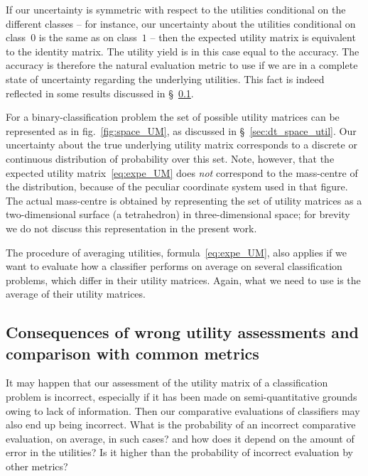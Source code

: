 \documentclass[\ifafour a4paper,12pt,\else a5paper,10pt,\fi%
onecolumn,oneside,article,%
british%
]{memoir}
\theoremstyle{remark}
\theoremstyle{innote}
\renewcommand*{\|}[1][]{\nonscript\:#1\vert\nonscript\:\mathopen{}}
\newcommand*{\sect}{\S}%
\newcommand*{\fig}{fig.}%
\begin{document}
If our uncertainty is symmetric with respect to the utilities conditional on the different classes -- for instance, our uncertainty about the utilities conditional on class~$0$ is the same as on class~$1$ -- then the expected utility matrix is equivalent to the identity matrix. The utility yield is in this case equal to the accuracy. The accuracy is therefore the natural evaluation metric to use if we are in a complete state of uncertainty regarding the underlying utilities. This fact is indeed reflected in some results discussed in \sect~\ref{sec:wrong_utility_assess}.


For a binary-classification problem the set of possible utility matrices can be represented as in \fig~\ref{fig:space_UM}, as discussed in \sect~\ref{sec:dt_space_util}. Our uncertainty about the true underlying utility matrix corresponds to a discrete or continuous distribution of probability over this set. Note, however, that the expected utility matrix~\eqref{eq:expe_UM} does \emph{not} correspond to the mass-centre of the distribution, because of the peculiar coordinate system used in that figure. The actual mass-centre is obtained by representing the set of utility matrices as a two-dimensional surface (a tetrahedron) in three-dimensional space; for brevity we do not discuss this representation in the present work.

\medskip

The procedure of averaging utilities, formula~\eqref{eq:expe_UM}, also applies if we want to evaluate how a classifier performs on average on several classification problems, which differ in their utility matrices. Again, what we need to use is the average of their utility matrices.



\subsection{Consequences of wrong utility assessments and comparison with common metrics}
\label{sec:wrong_utility_assess}

It may happen that our assessment of the utility matrix of a classification problem is incorrect, especially if it has been made on semi-quantitative grounds owing to lack of information. Then our comparative evaluations of classifiers may also end up being incorrect. What is the probability of an incorrect comparative evaluation, on average, in such cases? and how does it depend on the amount of error in the utilities? Is it higher than the probability of incorrect evaluation by other metrics?
\end{document}
